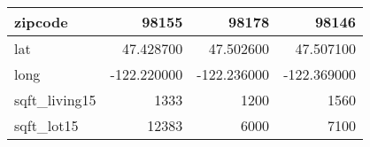 \begin{table}[H]
\begin{tabular}{|l|r|r|r|}
\hline zipcode & \cellcolor[rgb]{0.9, 0.54, 0.52} 98155 & 98178 & 98146 \\
\hline lat & \cellcolor[rgb]{0.9, 0.54, 0.52} 47.428700 & 47.502600 & 47.507100 \\
\hline long & \cellcolor[rgb]{0.9, 0.54, 0.52} -122.220000 & \cellcolor[rgb]{0.9, 0.54, 0.52} -122.236000 & \cellcolor[rgb]{0.9, 0.54, 0.52} -122.369000 \\
\hline sqft\_living15 & \cellcolor[rgb]{0.9, 0.54, 0.52} 1333 & 1200 & 1560 \\
\hline sqft\_lot15 & \cellcolor[rgb]{0.9, 0.54, 0.52} 12383 & 6000 & 7100 \\
\hline
\end{tabular}
\end{table}
